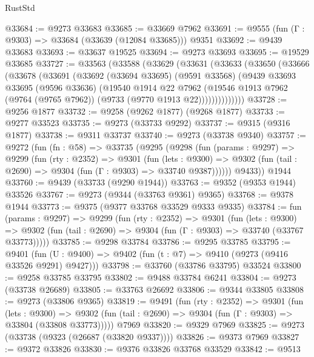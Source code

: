 \begin{lexlean}{RustStd}
\begin{coremodule}
@33684 := @9273 @33683
@33685 := @33669 @7962
@33691 := @9555 (fun (Γ : @9303) => @33684 (@33639 (@12084 @33685))) @9351
@33692 := @9439 @33683
@33693 := @33637 @19525
@33694 := @9273 @33693
@33695 := @19529 @33685
@33727 := @33563
    (@33588
      (@33629
        (@33631
          (@33633
            (@33650
              (@33666
                (@33678
                  (@33691
                    (@33692
                      (@33694 @33695)
                      (@9591 @33568)
                      (@9439
                        @33693
                        @33695
                        (@9596 @33636)
                        (@19540
                          @1914
                          @22
                          @7962
                          (@19546
                            @1913
                            @7962
                            (@9764 (@9765 @7962))
                            (@9733 (@9770 @1913 @22))))))))))))))
@33728 := @9256 @1877
@33732 := @9258 (@9262 @1877) (@9268 @1877)
@33733 := @9277 @33523
@33735 := @9273 (@33733 @9292)
@33737 := @9315 (@9316 @1877)
@33738 := @9311 @33737
@33740 := @9273 (@33738 @9340)
@33757 := @9272
    (fun (fn : @58) =>
    @33735
      (@9295
        (@9298
          (fun (params : @9297) =>
          @9299
            (fun (rty : @2352) =>
            @9301
              (fun (lets : @9300) =>
              @9302 (fun (tail : @2690) => @9304 (fun (Γ : @9303) => @33740 @9387))))))
        @9433))
    @1944
@33760 := @9439 (@33733 (@9290 @1944))
@33763 := @9352 (@9353 @1944) @33526
@33767 := @9273 (@9344 (@33763 @9361) @9365)
@33768 := @9378 @1944
@33773 := @9375 (@9377 @33768 @33529 @9333 @9335)
@33784 := fun (params : @9297) =>
  @9299
    (fun (rty : @2352) =>
    @9301
      (fun (lets : @9300) =>
      @9302 (fun (tail : @2690) => @9304 (fun (Γ : @9303) => @33740 (@33767 @33773)))))
@33785 := @9298 @33784
@33786 := @9295 @33785
@33795 := @9401
    (fun (U : @9400) => @9402 (fun (t : @7) => @9410 (@9273 (@9416 @33526 @9291) @9427)))
@33798 := @33760 (@33786 @33795) @33524
@33800 := @9258 @33785 @33795
@33802 := @9488 @33784 @6241
@33804 := @9273 (@33738 @26689)
@33805 := @33763 @26692
@33806 := @9344 @33805
@33808 := @9273 (@33806 @9365)
@33819 := @9491
    (fun (rty : @2352) =>
    @9301
      (fun (lets : @9300) =>
      @9302 (fun (tail : @2690) => @9304 (fun (Γ : @9303) => @33804 (@33808 @33773)))))
    @7969
@33820 := @9329 @7969
@33825 := @9273 (@33738 (@9323 (@26687 (@33820 @9337))))
@33826 := @9373 @7969
@33827 := @9372 @33826
@33830 := @9376 @33826 @33768 @33529
@33842 := @9513

\end{coremodule}
\end{lexlean}
